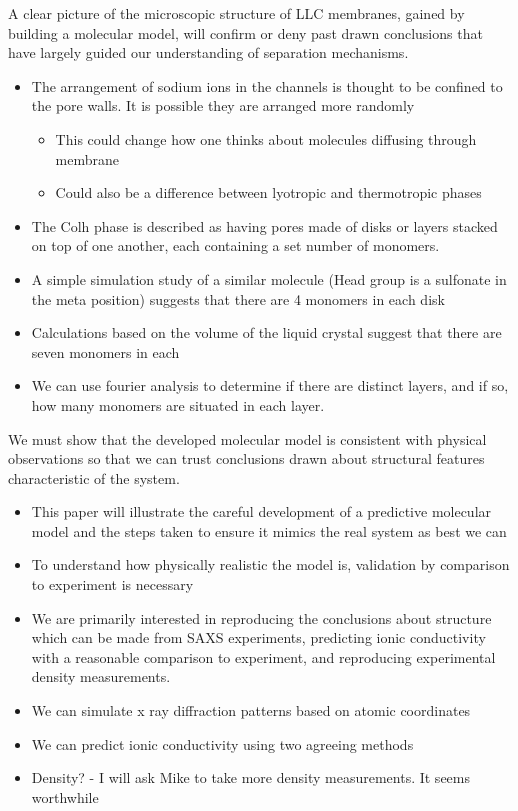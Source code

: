 \documentclass{article}
\begin{document}
	A clear picture of the microscopic structure of LLC membranes, gained by building a molecular model, will confirm or deny past drawn conclusions that have largely guided our understanding of separation mechanisms. 
	\begin{itemize}
		\item The arrangement of sodium ions in the channels is thought to be confined to the pore walls. It is possible they are arranged more randomly
		\begin{itemize}
			\item This could change how one thinks about molecules diffusing through membrane
			\item Could also be a difference between lyotropic and thermotropic phases
		\end{itemize}
		\item The Colh phase is described as having pores made of disks or layers stacked on top of one another, each containing a set number of monomers. 
		\item A simple simulation study of a similar molecule (Head group is a sulfonate in the meta position) suggests that there are 4 monomers in each disk
		\item Calculations based on the volume of the liquid crystal suggest that there are seven monomers in each 
		\item We can use fourier analysis to determine if there are distinct layers, and if so, how many monomers are situated in each layer.
	\end{itemize}
	
	We must show that the developed molecular model is consistent with physical observations so that we can trust conclusions drawn about structural features characteristic of the system.
	\begin{itemize}
		\item This paper will illustrate the careful development of a predictive molecular model and the steps taken to ensure it mimics the real system as best we can 
		\item To understand how physically realistic the model is, validation by comparison to experiment is necessary
		\item We are primarily interested in reproducing the conclusions about structure which can be made from SAXS experiments, predicting ionic conductivity with a reasonable comparison to experiment, and reproducing experimental density measurements.    
			\item We can simulate x ray diffraction patterns based on atomic coordinates
			\item We can predict ionic conductivity using two agreeing methods
			\item Density? - I will ask Mike to take more density measurements. It seems worthwhile     
	\end{itemize}
	
\end{document}
